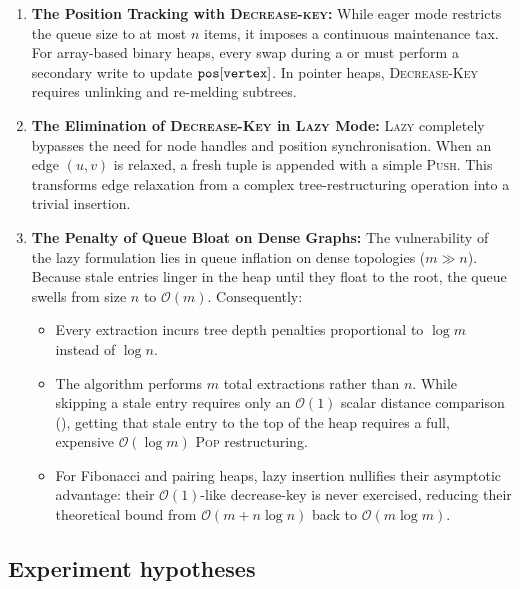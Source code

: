\begin{enumerate}
  \item \textbf{The Position Tracking with \textsc{Decrease-key}:} 
  While eager mode restricts the queue size to at most $n$ items, it imposes a continuous maintenance tax. For array-based binary heaps, every swap during a  or  must perform a secondary write to update $\texttt{pos}[\code{vertex}]$. In pointer heaps, \textsc{Decrease-Key} requires unlinking and re-melding subtrees. 
  
  \item \textbf{The Elimination of \textsc{Decrease-Key} in \textsc{Lazy} Mode:} 
  \textsc{Lazy} completely bypasses the need for node handles and position synchronisation. When an edge $(u, v)$ is relaxed, a fresh  tuple is appended with a simple \textsc{Push}. This transforms edge relaxation from a complex tree-restructuring operation into a trivial insertion.

  \item \textbf{The Penalty of Queue Bloat on Dense Graphs:} 
  The vulnerability of the lazy formulation lies in queue inflation on dense topologies ($m \gg n$). Because stale entries linger in the heap until they float to the root, the queue swells from size $n$ to $\mathcal{O}(m)$. Consequently:
  \begin{itemize}
    \item Every extraction incurs tree depth penalties proportional to $\log m$ instead of $\log n$.
    \item The algorithm performs $m$ total extractions rather than $n$. While skipping a stale entry requires only an $\mathcal{O}(1)$ scalar distance comparison (), getting that stale entry to the top of the heap requires a full, expensive $\mathcal{O}(\log m)$ \textsc{Pop} restructuring.
    \item For Fibonacci and pairing heaps, lazy insertion nullifies their asymptotic advantage: their $\mathcal{O}(1)$-like decrease-key is never exercised, reducing their theoretical bound from $\mathcal{O}(m + n \log n)$ back to $\mathcal{O}(m \log m)$.
  \end{itemize}
\end{enumerate}

\noindent

\subsection{Experiment hypotheses}
